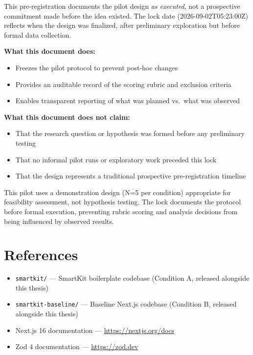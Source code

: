 This pre-registration documents the pilot design \textit{as executed}, not a prospective commitment made before the idea existed. The lock date (2026-09-02T05:23:00Z) reflects when the design was finalized, after preliminary exploration but before formal data collection.

\textbf{What this document does:}
\begin{itemize}
\item Freezes the pilot protocol to prevent post-hoc changes
\item Provides an auditable record of the scoring rubric and exclusion criteria
\item Enables transparent reporting of what was planned vs.\ what was observed
\end{itemize}

\textbf{What this document does not claim:}
\begin{itemize}
\item That the research question or hypothesis was formed before any preliminary testing
\item That no informal pilot runs or exploratory work preceded this lock
\item That the design represents a traditional prospective pre-registration timeline
\end{itemize}

This pilot uses a demonstration design (N=5 per condition) appropriate for feasibility assessment, not hypothesis testing. The lock documents the protocol before formal execution, preventing rubric scoring and analysis decisions from being influenced by observed results.


\section{References}

\begin{itemize}
\item \texttt{smartkit/} — SmartKit boilerplate codebase (Condition A, released alongside this thesis)
\item \texttt{smartkit-baseline/} — Baseline Next.js codebase (Condition B, released alongside this thesis)
\item Next.js 16 documentation — \url{https://nextjs.org/docs}
\item Zod 4 documentation — \url{https://zod.dev}
\end{itemize}


